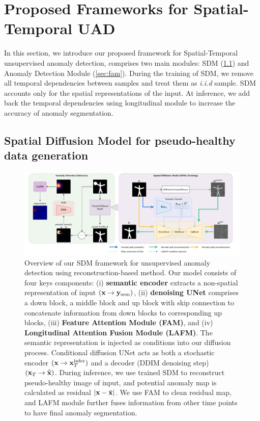 \chapter{Proposed Frameworks for Spatial-Temporal UAD}
\label{chap:sdm}

In this section, we introduce our proposed framework for Spatial-Temporal unsupervised anomaly detection, comprises two main modules: \ac{SDM} (\cref{sec:sdm}) and Anomaly Detection Module (\cref{sec:fam}). During the training of \ac{SDM}, we remove all temporal dependencies between samples and treat them as \emph{i.i.d} sample. \ac{SDM} accounts only for the spatial representations of the input. At inference, we add back the temporal dependencies using longitudinal module to increase the accuracy of anomaly segmentation. 

\minitoc

\section{Spatial Diffusion Model for pseudo-healthy data generation}
\label{sec:sdm}

\begin{figure}[htbp]
    \centering
    \includegraphics[width=1\linewidth]{figures/model-sdm.pdf}
    \caption[Overview of Spatial-Temporal UAD framework]{Overview of our \ac{SDM} framework for unsupervised anomaly detection using reconstruction-based method. Our model consists of four keys components: (i) \textbf{semantic encoder} extracts a non-spatial representation of input $({\mathbf{x}} \to {\mathbf{y}}_{\text{sem}})$, (ii) \textbf{denoising UNet} comprises a down block, a middle block and up block with skip connection to concatenate information from down blocks to corresponding up blocks, (iii) \textbf{Feature Attention Module (FAM)}, and (iv) \textbf{Longitudinal Attention Fusion Module (LAFM)}. The semantic representation is injected as conditions into our diffusion process. Conditional diffusion UNet acts as both a stochastic encoder $({\mathbf{x}} \to {\mathbf{x}}_T^{\text{infer}})$ and a decoder (DDIM denoising step) $({\mathbf{x}}_T \to \widehat{{\mathbf{x}}})$. During inference, we use trained SDM to reconstruct pseudo-healthy image of input, and potential anomaly map is calculated as residual $|{\mathbf{x}} - \hat{{\mathbf{x}}}|$. We use \ac{FAM} to clean residual map, and \ac{LAFM} module further fuses information from other time points to have final anomaly segmentation.} 
    \label{fig:model-sdm}
\end{figure}

